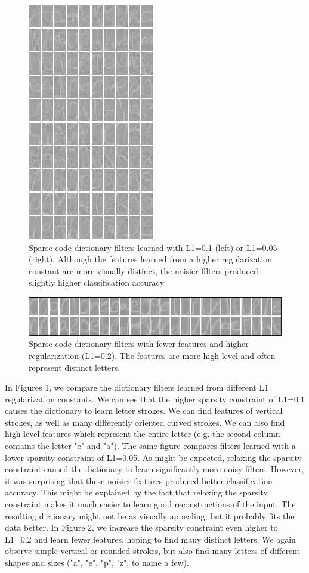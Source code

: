 \documentclass{article} %
\begin{document}
\begin{figure}
\includegraphics[scale=1]{figures/filters_100_noisy.png}
\caption{Sparse code dictionary filters learned with L1=0.1 (left) or L1=0.05 (right). Although the features learned from a higher regularization constant are more visually distinct, the noisier filters produced slightly higher classification accuracy}
\end{figure}

\begin{figure}
\centering
\includegraphics[scale=1]{figures/filters_50.png}
\caption{Sparse code dictionary filters with fewer features and higher regularization (L1=0.2). The features are more high-level and often represent distinct letters.}
\end{figure}

In Figures 1, we compare the dictionary filters learned from different L1 regularization constants. We can see that the higher sparsity constraint of L1=0.1 causes the dictionary to learn letter strokes. We can find features of vertical strokes, as well as many differently oriented curved strokes. We can also find high-level features which represent the entire letter (e.g. the second column contains the letter "e" and "a"). The same figure compares filters learned with a lower sparsity constraint of L1=0.05. As might be expected, relaxing the sparsity constraint caused the dictionary to learn significantly more noisy filters. However, it was surprising that these noisier features produced better classification accuracy. This might be explained by the fact that relaxing the sparsity constraint makes it much easier to learn good reconstructions of the input. The resulting dictionary might not be as visually appealing, but it probably fits the data better. In Figure 2, we increase the sparsity constraint even higher to L1=0.2 and learn fewer features, hoping to find many distinct letters. We again observe simple vertical or rounded strokes, but also find many letters of different shapes and sizes ("a", "e", "p", "z", to name a few).
\end{document}
